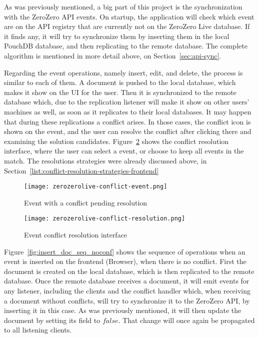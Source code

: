 As was previously mentioned, a big part of this project is the synchronization with the ZeroZero API events. On startup, the application will check which event are on the API registry that are currently not on the ZeroZero Live database. If it finds any, it will try to synchronize them by inserting them in the local PouchDB database, and then replicating to the remote database. The complete algorithm is mentioned in more detail above, on Section~\ref{sec:api-sync}. 

Regarding the event operations, namely insert, edit, and delete, the process is similar to each of them. A document is pushed to the local database, which makes it show on the UI for the user. Then it is synchronized to the remote database which, due to the replication listener will make it show on other users' machines as well, as soon as it replicates to their local databases. It may happen that during these replications a conflict arises. In those cases, the conflict icon is shown on the event, and the user can resolve the conflict after clicking there and examining the solution candidates. Figure~\ref{fig:zerozerolive-conflict-resolution} shows the conflict resolution interface, where the user can select a  event, or choose to keep all events in the match. The resolutions strategies were already discussed above, in Section~\ref{list:conflict-resolution-strategies-frontend}

\begin{figure}[h]
    \begin{center}
        \leavevmode
        \texttt{[image: zerozerolive-conflict-event.png]}
        \caption{Event with a conflict pending resolution}
        \label{fig:zerozerolive-conflict-event}
    \end{center}
\end{figure}

\begin{figure}[h]
    \begin{center}
        \leavevmode
        \texttt{[image: zerozerolive-conflict-resolution.png]}
        \caption{Event conflict resolution interface}
        \label{fig:zerozerolive-conflict-resolution}
    \end{center}
\end{figure}

Figure~\ref{fig:insert_doc_seq_noconf} shows the sequence of operations when an event is inserted on the frontend (Browser), when there is no conflict. First the document is created on the local database, which is then replicated to the remote database. Once the remote database receives a document, it will emit events for any listener, including the clients and the conflict handler which, when receiving a document without conflicts, will try to synchronize it to the ZeroZero API, by inserting it in this case. As was previously mentioned, it will then update the document by setting its  field to $false$. That change will once again be propagated to all listening clients.

